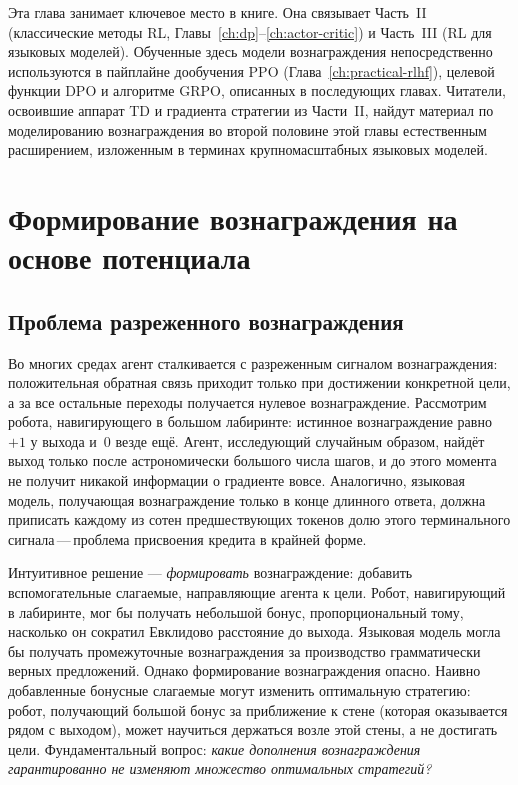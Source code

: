 Эта глава занимает ключевое место в книге. Она связывает Часть~II (классические методы RL, Главы~\ref{ch:dp}--\ref{ch:actor-critic}) и Часть~III (RL для языковых моделей). Обученные здесь модели вознаграждения непосредственно используются в пайплайне дообучения PPO (Глава~\ref{ch:practical-rlhf}), целевой функции DPO и алгоритме GRPO, описанных в последующих главах. Читатели, освоившие аппарат TD и градиента стратегии из Части~II, найдут материал по моделированию вознаграждения во второй половине этой главы естественным расширением, изложенным в терминах крупномасштабных языковых моделей.

\section{Формирование вознаграждения на основе потенциала}
\label{sec:reward-shaping}

\subsection{Проблема разреженного вознаграждения}

Во многих средах агент сталкивается с разреженным сигналом вознаграждения: положительная обратная связь приходит только при достижении конкретной цели, а за все остальные переходы получается нулевое вознаграждение. Рассмотрим робота, навигирующего в большом лабиринте: истинное вознаграждение равно~$+1$ у выхода и~$0$ везде ещё. Агент, исследующий случайным образом, найдёт выход только после астрономически большого числа шагов, и до этого момента не получит никакой информации о градиенте вовсе. Аналогично, языковая модель, получающая вознаграждение только в конце длинного ответа, должна приписать каждому из сотен предшествующих токенов долю этого терминального сигнала\,---\,проблема присвоения кредита в крайней форме.

Интуитивное решение --- \emph{формировать} вознаграждение: добавить вспомогательные слагаемые, направляющие агента к цели. Робот, навигирующий в лабиринте, мог бы получать небольшой бонус, пропорциональный тому, насколько он сократил Евклидово расстояние до выхода. Языковая модель могла бы получать промежуточные вознаграждения за производство грамматически верных предложений. Однако формирование вознаграждения опасно. Наивно добавленные бонусные слагаемые могут изменить оптимальную стратегию: робот, получающий большой бонус за приближение к стене (которая оказывается рядом с выходом), может научиться держаться возле этой стены, а не достигать цели. Фундаментальный вопрос: \emph{какие дополнения вознаграждения гарантированно не изменяют множество оптимальных стратегий?}

